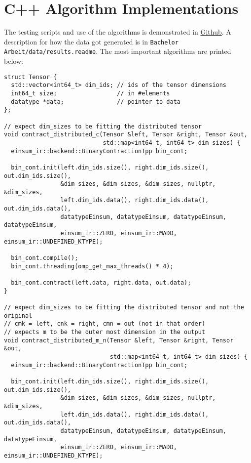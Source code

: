 \appendix

\section{C++ Algorithm Implementations}

The testing scripts and use of the algorithms is demonstrated in \href{https://github.com/Minutenreis/einsum_ir}{Github}.
A description for how the data got generated is in \texttt{Bachelor Arbeit/data/results.readme}.
The most important algorithms are printed below:


\scriptsize{
\begin{verbatim}
struct Tensor {
  std::vector<int64_t> dim_ids; // ids of the tensor dimensions
  int64_t size;                 // in #elements
  datatype *data;               // pointer to data
};

// expect dim_sizes to be fitting the distributed tensor
void contract_distributed_c(Tensor &left, Tensor &right, Tensor &out, 
                            std::map<int64_t, int64_t> dim_sizes) {
  einsum_ir::backend::BinaryContractionTpp bin_cont;

  bin_cont.init(left.dim_ids.size(), right.dim_ids.size(), out.dim_ids.size(),
                &dim_sizes, &dim_sizes, &dim_sizes, nullptr, &dim_sizes,
                left.dim_ids.data(), right.dim_ids.data(), out.dim_ids.data(),
                datatypeEinsum, datatypeEinsum, datatypeEinsum, datatypeEinsum,
                einsum_ir::ZERO, einsum_ir::MADD, einsum_ir::UNDEFINED_KTYPE);

  bin_cont.compile();
  bin_cont.threading(omp_get_max_threads() * 4);

  bin_cont.contract(left.data, right.data, out.data);
}

// expect dim_sizes to be fitting the distributed tensor and not the original
// cmk = left, cnk = right, cmn = out (not in that order)
// expects m to be the outer most dimension in the output
void contract_distributed_m_n(Tensor &left, Tensor &right, Tensor &out, 
                              std::map<int64_t, int64_t> dim_sizes) {
  einsum_ir::backend::BinaryContractionTpp bin_cont;

  bin_cont.init(left.dim_ids.size(), right.dim_ids.size(), out.dim_ids.size(),
                &dim_sizes, &dim_sizes, &dim_sizes, nullptr, &dim_sizes,
                left.dim_ids.data(), right.dim_ids.data(), out.dim_ids.data(),
                datatypeEinsum, datatypeEinsum, datatypeEinsum, datatypeEinsum,
                einsum_ir::ZERO, einsum_ir::MADD, einsum_ir::UNDEFINED_KTYPE);


\end{verbatim}}
